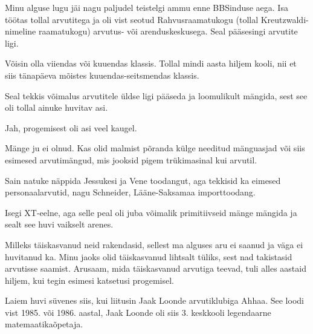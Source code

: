 
Minu alguse lugu jäi nagu paljudel teistelgi ammu enne 
BBSinduse aega. Isa töötas tollal arvutitega 
ja oli vist seotud Rahvusraamatukogu (tollal 
Kreutzwaldi-nimeline raamatukogu) arvutus- või arenduskeskusega. Seal pääsesingi arvutite ligi. 


Võisin olla viiendas või kuuendas klassis. Tollal mindi aasta 
hiljem kooli, nii et siis tänapäeva mõistes kuuendas-seitsmendas klassis. 

Seal tekkis võimalus arvutitele üldse ligi pääseda ja loomulikult 
mängida, sest see oli tollal ainuke huvitav asi.


Jah, progemisest oli asi veel kaugel.

Mänge ju ei olnud. Kas olid malmist põranda külge needitud mänguasjad või siis 
esimesed arvutimängud, mis jooksid pigem trükimasinal kui 
arvutil. 


Sain natuke näppida Jessukesi ja 
Vene toodangut, aga tekkisid ka eimesed personaalarvutid, nagu 
Schneider, 
Lääne-Saksamaa importtoodang.


Isegi XT-eelne, aga selle peal oli juba võimalik primitiivseid mänge 
mängida ja sealt see huvi vaikselt arenes. 


Milleks täiskasvanud neid rakendasid, sellest ma alguses aru ei saanud ja 
väga ei huvitanud ka. Minu jaoks olid täiskasvanud lihtsalt tüliks, sest nad 
takistasid arvutisse saamist. Arusaam, mida täiskasvanud arvutiga 
teevad, tuli alles aastaid hiljem, kui tegin esimesi katsetusi 
progemisel.

Laiem huvi süvenes siis, kui liitusin Jaak 
Loonde arvutiklubiga 
Ahhaa. See loodi vist 1985. või 1986. aastal, Jaak 
Loonde oli siis 3. keskkooli legendaarne 
matemaatikaõpetaja. 

